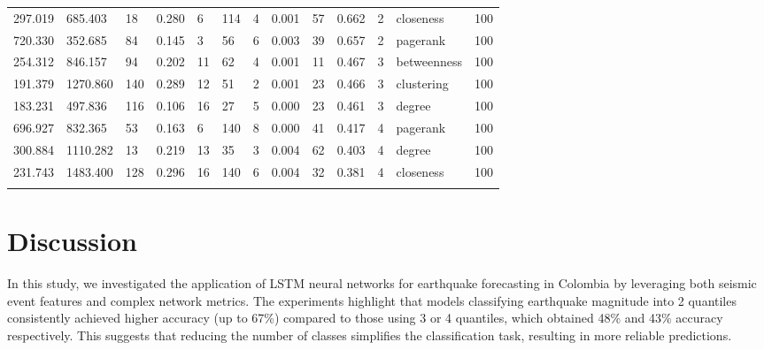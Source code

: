 \documentclass[sn-mathphys-num]{sn-jnl}
\begin{document}
\begin{table}
\begin{tabularx}{\textwidth}{@{}XXXXXXXXXXXll@{}}
        297.019  & 685.403   & 18       & 0.280     & 6          & 114         & 4           & 0.001 & 57         & 0.662    & 2         & closeness        & 100       \\
        720.330  & 352.685   & 84       & 0.145     & 3          & 56          & 6           & 0.003 & 39         & 0.657    & 2         & pagerank         & 100       \\
        \midrule
        254.312  & 846.157   & 94       & 0.202     & 11         & 62          & 4           & 0.001 & 11         & 0.467    & 3         & betweenness      & 100       \\
        191.379  & 1270.860  & 140      & 0.289     & 12         & 51          & 2           & 0.001 & 23         & 0.466    & 3         & clustering       & 100       \\
        183.231  & 497.836   & 116      & 0.106     & 16         & 27          & 5           & 0.000 & 23         & 0.461    & 3         & degree           & 100       \\
        \midrule
        696.927  & 832.365   & 53       & 0.163     & 6          & 140         & 8           & 0.000 & 41         & 0.417    & 4         & pagerank         & 100       \\
        300.884  & 1110.282  & 13       & 0.219     & 13         & 35          & 3           & 0.004 & 62         & 0.403    & 4         & degree           & 100       \\
        231.743  & 1483.400  & 128      & 0.296     & 16         & 140         & 6           & 0.004 & 32         & 0.381    & 4         & closeness        & 100       \\
        \botrule
    \end{tabularx}
    
    
\end{table}
\unskip

\section{Discussion}\label{discussion}

In this study, we investigated the application of LSTM neural networks for earthquake forecasting in Colombia by leveraging both seismic event features and complex network metrics. The experiments highlight that models classifying earthquake magnitude into 2 quantiles consistently achieved higher accuracy (up to 67\%) compared to those using 3 or 4 quantiles, which obtained 48\% and 43\% accuracy respectively. This suggests that reducing the number of classes simplifies the classification task, resulting in more reliable predictions.
\end{document}
